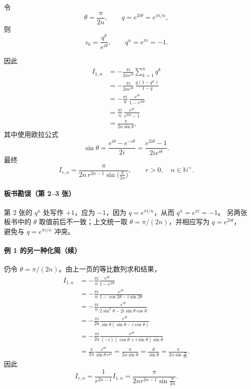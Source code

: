 令
\[
  \theta=\frac{\pi}{2n},\qquad
  q=e^{2i\theta}=e^{\pi i/n},
\]
则
\[
  z_k=\frac{q^k}{e^{i\theta}},
  \qquad q^n=e^{\pi i}=-1.
\]

因此
\begin{align*}
  I_{1,n}
  &=-\frac{\pi i}{2n e^{i\theta}}\sum_{k=1}^{n}q^k\\
  &=-\frac{\pi i}{2n e^{i\theta}}\,
    \frac{q(1-q^n)}{1-q}\\
  &=-\frac{\pi i}{n}\,
    \frac{e^{i\theta}}{1-e^{2i\theta}}\\
  &=\frac{\pi i}{n}\,
    \frac{e^{i\theta}}{e^{2i\theta}-1}\\
  &=\frac{\pi}{2n\sin\theta},
\end{align*}
其中使用欧拉公式
\[
  \sin\theta=\frac{e^{i\theta}-e^{-i\theta}}{2i}
            =\frac{e^{2i\theta}-1}{2i e^{i\theta}}.
\]
最终
\[
  \boxed{
    I_{r,n}=\frac{\pi}
    {2n\,r^{2n-1}\sin\bigl(\frac{\pi}{2n}\bigr)}
  },\qquad r>0,\quad n\in\mathbb{N}^{+}.
\]

\paragraph{板书勘误（第 2--3 张）}
第 2 张的 $q^n$ 处写作 $+1$，应为 $-1$，因为
$q=e^{\pi i/n}$，从而 $q^n=e^{\pi i}=-1$。
另两张板书中的 $\theta$ 取值前后不一致；上文统一取
$\theta=\pi/(2n)$，并相应写为 $q=e^{2i\theta}$，
避免与 $q=e^{\pi i/n}$ 冲突。



\paragraph{例 1 的另一种化简（续）}
仍令 $\theta=\pi/(2n)$。由上一页的等比数列求和结果，
\begin{align*}
  I_{1,n}
  &=-\frac{\pi i}{n}\frac{e^{i\theta}}{1-e^{2i\theta}}\\
  &=-\frac{\pi i}{n}
    \frac{e^{i\theta}}{1-\cos2\theta-i\sin2\theta}\\
  &=-\frac{\pi i}{n}
    \frac{e^{i\theta}}{2\sin^2\theta-2i\sin\theta\cos\theta}\\
  &=-\frac{\pi i}{2n}
    \frac{e^{i\theta}}{\sin\theta(\sin\theta-i\cos\theta)}\\
  &=-\frac{\pi i}{2n}
    \frac{e^{i\theta}}{(-i)(\cos\theta+i\sin\theta)\sin\theta}\\
  &=\frac{\pi}{2n}\frac{e^{i\theta}}{\sin\theta\,e^{i\theta}}
    =\frac{\pi}{2n\sin\theta}
    =\frac{\theta}{\sin\theta}
    =\frac{\pi}{2n\sin\frac{\pi}{2n}}.
\end{align*}
因此
\[
  I_{r,n}=\frac{1}{r^{2n-1}}I_{1,n}
  =\frac{\pi}{2nr^{2n-1}\sin\frac{\pi}{2n}}.
\]

